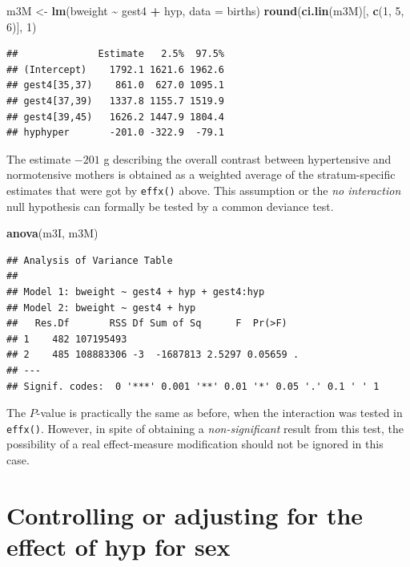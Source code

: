 \documentclass[
]{book}
\newenvironment{Shaded}{\begin{snugshade}}{\end{snugshade}}
\newcommand{\AttributeTok}[1]{\textcolor[rgb]{0.13,0.29,0.53}{#1}}
\newcommand{\DecValTok}[1]{\textcolor[rgb]{0.00,0.00,0.81}{#1}}
\newcommand{\FunctionTok}[1]{\textcolor[rgb]{0.13,0.29,0.53}{\textbf{#1}}}
\newcommand{\NormalTok}[1]{#1}
\newcommand{\OtherTok}[1]{\textcolor[rgb]{0.56,0.35,0.01}{#1}}
\newcommand{\SpecialCharTok}[1]{\textcolor[rgb]{0.81,0.36,0.00}{\textbf{#1}}}
\begin{document}
\begin{Shaded}
\begin{Highlighting}[]
\NormalTok{m3M }\OtherTok{\textless{}{-}} \FunctionTok{lm}\NormalTok{(bweight }\SpecialCharTok{\textasciitilde{}}\NormalTok{ gest4 }\SpecialCharTok{+}\NormalTok{ hyp, }\AttributeTok{data =}\NormalTok{ births)}
\FunctionTok{round}\NormalTok{(}\FunctionTok{ci.lin}\NormalTok{(m3M)[, }\FunctionTok{c}\NormalTok{(}\DecValTok{1}\NormalTok{, }\DecValTok{5}\NormalTok{, }\DecValTok{6}\NormalTok{)], }\DecValTok{1}\NormalTok{)}
\end{Highlighting}
\end{Shaded}

\begin{verbatim}
##              Estimate   2.5%  97.5%
## (Intercept)    1792.1 1621.6 1962.6
## gest4[35,37)    861.0  627.0 1095.1
## gest4[37,39)   1337.8 1155.7 1519.9
## gest4[39,45)   1626.2 1447.9 1804.4
## hyphyper       -201.0 -322.9  -79.1
\end{verbatim}

The estimate \(-201\) g describing the overall contrast
between hypertensive and normotensive mothers is obtained
as a weighted average of the stratum-specific estimates
that were got by \texttt{effx()} above.
This assumption or the
\emph{no interaction} null hypothesis can formally be tested by a common deviance test.

\begin{Shaded}
\begin{Highlighting}[]
\FunctionTok{anova}\NormalTok{(m3I, m3M)}
\end{Highlighting}
\end{Shaded}

\begin{verbatim}
## Analysis of Variance Table
## 
## Model 1: bweight ~ gest4 + hyp + gest4:hyp
## Model 2: bweight ~ gest4 + hyp
##   Res.Df       RSS Df Sum of Sq      F  Pr(>F)  
## 1    482 107195493                              
## 2    485 108883306 -3  -1687813 2.5297 0.05659 .
## ---
## Signif. codes:  0 '***' 0.001 '**' 0.01 '*' 0.05 '.' 0.1 ' ' 1
\end{verbatim}

The \(P\)-value is practically the same as before,
when the interaction was tested in \texttt{effx()}.
However, in spite of obtaining a \emph{non-significant}
result from this test, the possibility
of a real effect-measure modification
should not be ignored in this case.

\section{Controlling or adjusting for the effect of hyp for sex}\label{controlling-or-adjusting-for-the-effect-of-hyp-for-sex}
\end{document}
